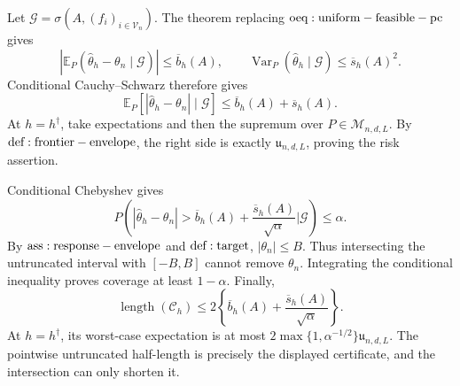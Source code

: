 Let \(\mathcal G=\sigma(A,(f_i)_{i\in\mathcal V_n})\).  The theorem replacing \({\rm oeq:uniform-feasible-pc}\) gives
\[
 |\mathbb E_P(\widehat\theta_h-\theta_n\mid\mathcal G)|\leq\overline b_h(A),
 \qquad
 \operatorname{Var}_P(\widehat\theta_h\mid\mathcal G)\leq\overline s_h(A)^2.
\]
Conditional Cauchy--Schwarz therefore gives
\[
 \mathbb E_P[|\widehat\theta_h-\theta_n|\mid\mathcal G]
 \leq\overline b_h(A)+\overline s_h(A).
\]
At \(h=h^\dagger\), take expectations and then the supremum over \(P\in\mathcal M_{n,d,L}\).  By \({\rm def:frontier-envelope}\), the right side is exactly \(\mathfrak u_{n,d,L}\), proving the risk assertion.

Conditional Chebyshev gives
\[
 P\!\left(
 |\widehat\theta_h-\theta_n|>
 \overline b_h(A)+\frac{\overline s_h(A)}{\sqrt\alpha}
 \mathrel{\Big|}\mathcal G\right)\leq\alpha.
\]
By \({\rm ass:response-envelope}\) and \({\rm def:target}\), \(|\theta_n|\leq B\).  Thus intersecting the untruncated interval with \([-B,B]\) cannot remove \(\theta_n\).  Integrating the conditional inequality proves coverage at least \(1-\alpha\).  Finally,
\[
 \operatorname{length}(\mathcal C_h)
 \leq2\left\{\overline b_h(A)+\frac{\overline s_h(A)}{\sqrt\alpha}\right\}.
\]
At \(h=h^\dagger\), its worst-case expectation is at most
\(2\max\{1,\alpha^{-1/2}\}\mathfrak u_{n,d,L}\).  The pointwise untruncated half-length is precisely the displayed certificate, and the intersection can only shorten it.